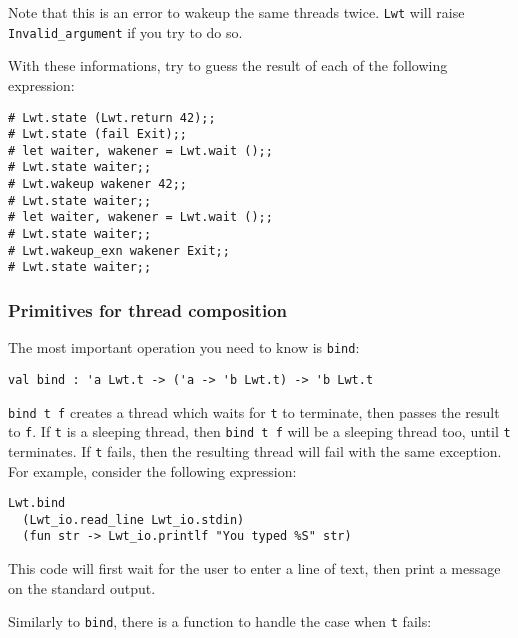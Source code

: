 Note that this is an error to wakeup the same threads twice. {\tt Lwt}
will raise {\tt Invalid\_argument} if you try to do so.



With these informations, try to guess the result of each of the
following expression:



\lstset{language=[Objective]Caml}\begin{lstlisting}
# Lwt.state (Lwt.return 42);;
# Lwt.state (fail Exit);;
# let waiter, wakener = Lwt.wait ();;
# Lwt.state waiter;;
# Lwt.wakeup wakener 42;;
# Lwt.state waiter;;
# let waiter, wakener = Lwt.wait ();;
# Lwt.state waiter;;
# Lwt.wakeup_exn wakener Exit;;
# Lwt.state waiter;;
\end{lstlisting}
\medskip

\noindent
\subsubsection{ Primitives for thread composition }

The most important operation you need to know is {\tt bind}:



\lstset{language=[Objective]Caml}\begin{lstlisting}
val bind : 'a Lwt.t -> ('a -> 'b Lwt.t) -> 'b Lwt.t
\end{lstlisting}
\medskip

\noindent
{\tt bind t f} creates a thread which waits for {\tt t} to
terminate, then passes the result to {\tt f}. If {\tt t} is a
sleeping thread, then {\tt bind t f} will be a sleeping thread too,
until {\tt t} terminates. If {\tt t} fails, then the resulting
thread will fail with the same exception. For example, consider the
following expression:



\lstset{language=[Objective]Caml}\begin{lstlisting}
Lwt.bind
  (Lwt_io.read_line Lwt_io.stdin)
  (fun str -> Lwt_io.printlf "You typed %S" str)
\end{lstlisting}
\medskip

\noindent
This code will first wait for the user to enter a line of text, then
print a message on the standard output.



Similarly to {\tt bind}, there is a function to handle the case
when {\tt t} fails:



